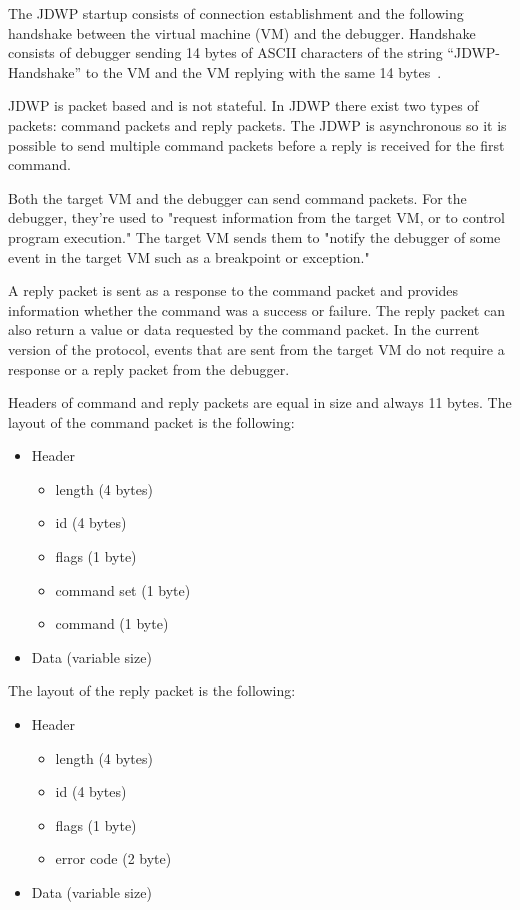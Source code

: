 \documentclass[..thesis.tex]{subfiles}
\begin{document}
% 
% 
The JDWP startup consists of connection establishment and the following handshake between the virtual machine (VM) and the debugger.
Handshake consists of debugger sending 14 bytes of ASCII characters of the string \enquote{JDWP-Handshake} to the VM and the VM replying with the same 14 bytes~\cite{oracle_jdwp_spec}.

JDWP is packet based and is not stateful. In JDWP there exist two types of packets: command packets and reply packets.
The JDWP is asynchronous so it is possible to send multiple command packets before a reply is received for the first command.

Both the target VM and the debugger can send command packets. For the debugger, they're used to "request information from the target VM, or to control program execution."
The target VM sends them to "notify the debugger of some event in the target VM such as a breakpoint or exception."\cite{oracle_jdwp_spec}

A reply packet is sent as a response to the command packet and provides information whether the command was a success or failure. The reply packet can also return a value or data requested by the command packet. In the current version of the protocol, events that are sent from the target VM do not require a response or a reply packet from the debugger.\cite{oracle_jdwp_spec}

Headers of command and reply packets are equal in size and always 11 bytes. The layout of the command packet is the following:
\begin{itemize}[nosep]
  \item Header
    \begin{itemize}[nosep]
      \item length (4 bytes)
      \item id (4 bytes)
      \item flags (1 byte)
      \item command set (1 byte)
      \item command (1 byte)
    \end{itemize}
  \item Data (variable size) 
\end{itemize}

The layout of the reply packet is the following:
\begin{itemize}[nosep]
  \item Header
    \begin{itemize}[nosep]
      \item length (4 bytes)
      \item id (4 bytes)
      \item flags (1 byte)
      \item error code (2 byte)
    \end{itemize}
  \item Data (variable size) 
\end{itemize}
\end{document}
